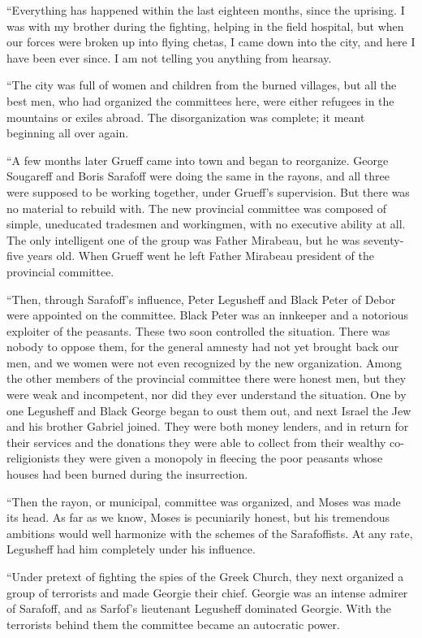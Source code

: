 \documentclass[a5paper,12pt]{book}
\begin{document}
“Everything has happened within the last eighteen months, since the uprising. I was with my brother during the fighting, helping in the field hospital, but when our forces were broken up into flying chetas, I came down into the city, and here I have been ever since. I am not telling you anything from hearsay. 

“The city was full of women and children from the burned villages, but all the best men, who had organized the committees here, were either refugees in the mountains or exiles abroad. The disorganization was complete; it meant beginning all over again. 

“A few months later Grueff came into town and began to reorganize. George Sougareff and Boris Sarafoff were doing the same in the rayons, and all three were supposed to be working together, under Grueff's supervision. But there was no material to rebuild with. The new provincial committee was composed of simple, uneducated tradesmen and workingmen, with no executive ability at all. The only intelligent one of the group was Father Mirabeau, but he was seventy-five years old. When Grueff went he left Father Mirabeau president of the provincial committee. 

“Then, through Sarafoff's influence, Peter Legusheff and Black Peter of Debor were appointed on the committee. Black Peter was an innkeeper and a notorious exploiter of the peasants. These two soon controlled the situation. There was nobody to oppose them, for the general amnesty had not yet brought back our men, and we women were not even recognized by the new organization. Among the other members of the provincial committee there were honest men, but they were weak and incompetent, nor did they ever understand the situation. One by one Legusheff and Black George began to oust them out, and next Israel the Jew and his brother Gabriel joined. They were both money lenders, and in return for their services and the donations they were able to collect from their wealthy co-religionists they were given a monopoly in fleecing the poor peasants whose houses had been burned during the insurrection. 

“Then the rayon, or municipal, committee was organized, and Moses was made its head. As far as we know, Moses is pecuniarily honest, but his tremendous ambitions would well harmonize with the schemes of the Sarafoffists. At any rate, Legusheff had him completely under his influence. 

“Under pretext of fighting the spies of the Greek Church, they next organized a group of terrorists and made Georgie their chief. Georgie was an intense admirer of Sarafoff, and as Sarfof's lieutenant Legusheff dominated Georgie. With the terrorists behind them the committee became an autocratic power. 
\end{document}
